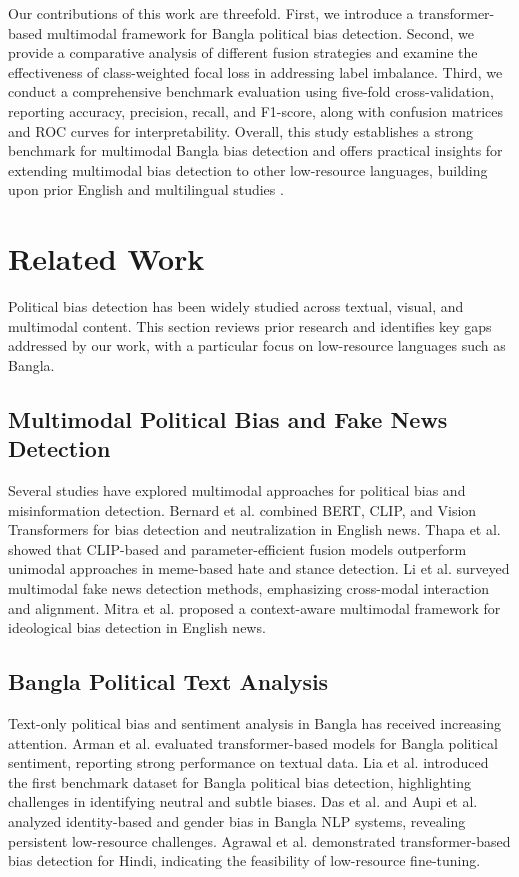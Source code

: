 \documentclass[11pt]{article}
\begin{document}
Our contributions of this work are threefold. First, we introduce a transformer-based multimodal framework for Bangla political bias detection. Second, we provide a comparative analysis of different fusion strategies and examine the effectiveness of class-weighted focal loss in addressing label imbalance. Third, we conduct a comprehensive benchmark evaluation using five-fold cross-validation, reporting accuracy, precision, recall, and F1-score, along with confusion matrices and ROC curves for interpretability. Overall, this study establishes a strong benchmark for multimodal Bangla bias detection and offers practical insights for extending multimodal bias detection to other low-resource languages, building upon prior English and multilingual studies \citep{bernard2025multimodal, thapa2025multimodal, mohiuddin2025memeguard}.


\section{Related Work}

Political bias detection has been widely studied across textual, visual, and multimodal content. This section reviews prior research and identifies key gaps addressed by our work, with a particular focus on low-resource languages such as Bangla.

\subsection{Multimodal Political Bias and Fake News Detection}
Several studies have explored multimodal approaches for political bias and misinformation detection. Bernard et al. \citep{bernard2025multimodal} combined BERT, CLIP, and Vision Transformers for bias detection and neutralization in English news. Thapa et al. \citep{thapa2025multimodal} showed that CLIP-based and parameter-efficient fusion models outperform unimodal approaches in meme-based hate and stance detection. Li et al. \citep{li2025survey} surveyed multimodal fake news detection methods, emphasizing cross-modal interaction and alignment. Mitra et al. \citep{mitra2026breaking} proposed a context-aware multimodal framework for ideological bias detection in English news. 

\subsection{Bangla Political Text Analysis}
Text-only political bias and sentiment analysis in Bangla has received increasing attention. Arman et al. \citep{arman2025bengali} evaluated transformer-based models for Bangla political sentiment, reporting strong performance on textual data. Lia et al. \citep{lia2025read} introduced the first benchmark dataset for Bangla political bias detection, highlighting challenges in identifying neutral and subtle biases. Das et al. \citep{das2025datasets} and Aupi et al. \citep{aupi2025wonbias} analyzed identity-based and gender bias in Bangla NLP systems, revealing persistent low-resource challenges. Agrawal et al. \citep{agrawal2022hindi} demonstrated transformer-based bias detection for Hindi, indicating the feasibility of low-resource fine-tuning. 
\end{document}
